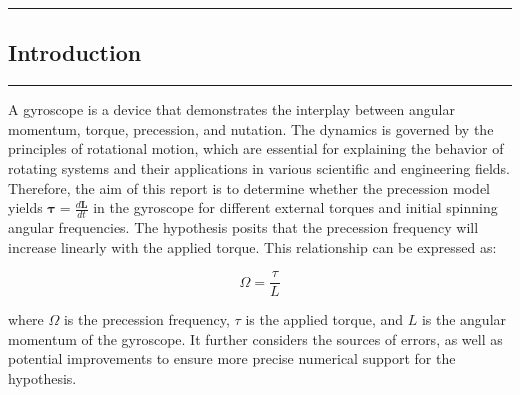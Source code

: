{\color{gray}\hrule}
\begin{center}
\section{Introduction}
\bigskip
\end{center}
{\color{gray}\hrule}


\begin{multicols}{2}
A gyroscope is a device that demonstrates the interplay between angular momentum, torque, precession, and nutation. The dynamics is governed by the principles of rotational motion, which are essential for explaining the behavior of rotating systems and their applications in various scientific and engineering fields. Therefore, the aim of this report is to determine whether the precession model yields $\boldsymbol\tau = \frac{d\mathbf{L}}{dt}$ in the gyroscope for different external torques and initial spinning angular frequencies. The hypothesis posits that the precession frequency will increase linearly with the applied torque. This relationship can be expressed as:

\begin{equation*}
    \Omega = \frac{\tau}{L}
\end{equation*}

where $\Omega$ is the precession frequency, $\tau$ is the applied torque, and $L$ is the angular momentum of the gyroscope. It further considers the sources of errors, as well as potential improvements to ensure more precise numerical support for the hypothesis.
\end{multicols}
